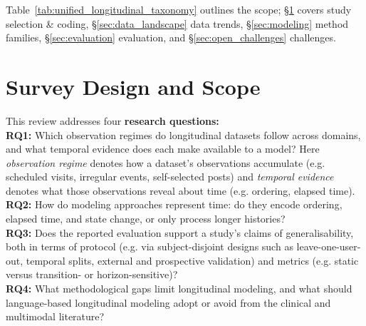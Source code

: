 \documentclass[11pt]{article}
\theoremstyle{plain}
\theoremstyle{definition}
\theoremstyle{remark}
\begin{document}
\noindent Table~\ref{tab:unified_longitudinal_taxonomy} outlines the scope; \S\ref{sec:survey_design} covers study selection \& coding, \S\ref{sec:data_landscape} data trends, \S\ref{sec:modeling} method families, \S\ref{sec:evaluation} evaluation, and \S\ref{sec:open_challenges} challenges.
\section{Survey Design and Scope}
\label{sec:survey_design}
This review addresses four \textbf{research questions:}\\ 
\textbf{RQ1:} Which observation regimes do longitudinal datasets follow across domains, and what temporal evidence does each make available to a model? Here \emph{observation regime} denotes how a dataset's observations accumulate (e.g. scheduled visits, irregular events, self-selected posts) and \emph{temporal evidence} denotes what those observations reveal about time (e.g. ordering, elapsed time).\\
\textbf{RQ2:} How do modeling approaches represent time: do they encode ordering, elapsed time, and state change, or only process longer histories?\\
\textbf{RQ3:} Does the reported evaluation support a study's claims of generalisability, both in terms of protocol (e.g. via subject-disjoint designs such as leave-one-user-out, temporal splits, external and prospective validation) and metrics (e.g. static versus transition- or horizon-sensitive)?\\
\textbf{RQ4:} What methodological gaps limit longitudinal modeling, and what should language-based longitudinal modeling adopt or avoid from the clinical and multimodal literature?\\
\end{document}
